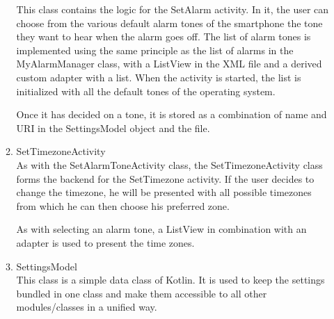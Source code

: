 \documentclass[conference]{IEEEtran}
\begin{document}
\begin{enumerate}
\begin{enumerate}
            This class contains the logic for the SetAlarm activity. In it, the user can choose from the various default alarm tones of the smartphone the tone they want to hear when the alarm goes off. The list of alarm tones is implemented using the same principle as the list of alarms in the MyAlarmManager class, with a ListView in the XML file and a derived custom adapter with a list. When the activity is started, the list is initialized with all the default tones of the operating system.
            \par Once it has decided on a tone, it is stored as a combination of name and URI in the SettingsModel object and the file. \\
        \item SetTimezoneActivity \\
            As with the SetAlarmToneActivity class, the SetTimezoneActivity class forms the backend for the SetTimezone activity. If the user decides to change the timezone, he will be presented with all possible timezones from which he can then choose his preferred zone.
            \par As with selecting an alarm tone, a ListView in combination with an adapter is used to present the time zones. \\
        \item SettingsModel \\
            This class is a simple data class of Kotlin. It is used to keep the settings bundled in one class and make them accessible to all other modules/classes in a unified way. \\
        
    \end{enumerate}
\end{enumerate}
\end{document}
